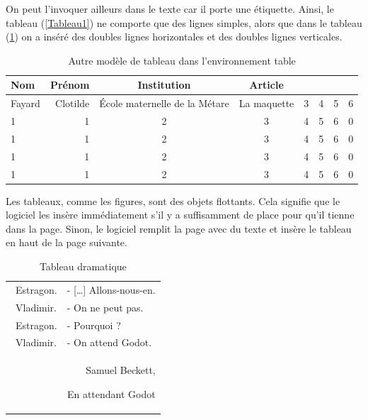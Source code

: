 On peut l'invoquer ailleurs dans le texte car il porte une étiquette. Ainsi, le tableau (\ref{Tableau1}) ne comporte que des lignes simples, alors que dans le tableau (\ref{Tableau2}) on a inséré des doubles lignes horizontales et des doubles lignes verticales.

 \begin{table}[ht]
\begin{center}
\begin{tabular}{|l||r| c| c| c| c|| c c|}
 \hline
 Nom &  Pr\'{e}nom & Institution & Article &  & &  &  \\ \hline \hline
   Fayard & Clotilde& École maternelle de la Métare& La maquette & 3 & 4& 5 & 6 \\ \hline
   1 &1& 2 & 3 & 4& 5& 6 &  0 \\ \hline
   1 &1& 2 & 3 & 4& 5& 6 &  0 \\ \hline
   1 &1& 2 & 3 & 4& 5& 6 &  0 \\ \hline
   1 &1& 2 & 3 & 4& 5& 6 &  0 \\ \hline

\end{tabular}
\end{center}
\caption{ \label{Tableau2} {Autre mod\`{e}le de tableau dans l'environnement table} }
\end{table}


Les tableaux, comme les figures, sont des objets flottants. Cela signifie que le logiciel les insère immédiatement s'il y a suffisamment de place pour qu'il tienne dans la page. Sinon, le logiciel remplit la page avec du texte et insère le tableau en haut de la page suivante.




 \begin{table}[ht]
 \begin{flushright}
\begin{tabular}{ll}\ 
Estragon.   & -  […] Allons-nous-en. \\
~Vladimir.   & -  On ne peut pas. \\
~Estragon.   & -  Pourquoi ? \\
~Vladimir. & -  On attend Godot. \\ 
 \multicolumn{2}{r}{~~~~~~Samuel Beckett, \begin{itshape} En attendant Godot \end{itshape}} \\
 \end{tabular}
 \end{flushright}
\caption{ \label{Tableau3} {Tableau dramatique} }
\end{table}

